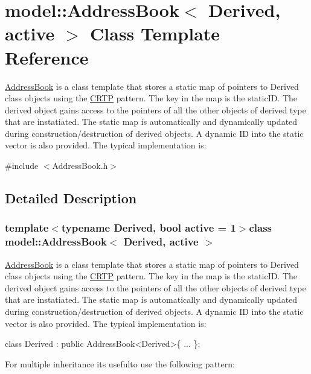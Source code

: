 \hypertarget{classmodel_1_1_address_book}{}\section{model\+:\+:Address\+Book$<$ Derived, active $>$ Class Template Reference}
\label{classmodel_1_1_address_book}


\hyperlink{classmodel_1_1_address_book}{Address\+Book} is a class template that stores a static map of pointers to Derived class objects using the \hyperlink{classmodel_1_1_c_r_t_p}{C\+R\+T\+P} pattern. The key in the map is the static\+I\+D. The derived object gains access to the pointers of all the other objects of derived type that are instatiated. The static map is automatically and dynamically updated during construction/destruction of derived objects. A dynamic I\+D into the static vector is also provided. The typical implementation is\+:  




{\ttfamily \#include $<$Address\+Book.\+h$>$}



\subsection{Detailed Description}
\subsubsection*{template$<$typename Derived, bool active = 1$>$class model\+::\+Address\+Book$<$ Derived, active $>$}

\hyperlink{classmodel_1_1_address_book}{Address\+Book} is a class template that stores a static map of pointers to Derived class objects using the \hyperlink{classmodel_1_1_c_r_t_p}{C\+R\+T\+P} pattern. The key in the map is the static\+I\+D. The derived object gains access to the pointers of all the other objects of derived type that are instatiated. The static map is automatically and dynamically updated during construction/destruction of derived objects. A dynamic I\+D into the static vector is also provided. The typical implementation is\+: 


\begin{DoxyCode}
\textcolor{keyword}{class }Derived : \textcolor{keyword}{public} AddressBook<Derived>\{
...
\};
\end{DoxyCode}


For multiple inheritance it\textquotesingle{}s usefulto use the following pattern\+:


